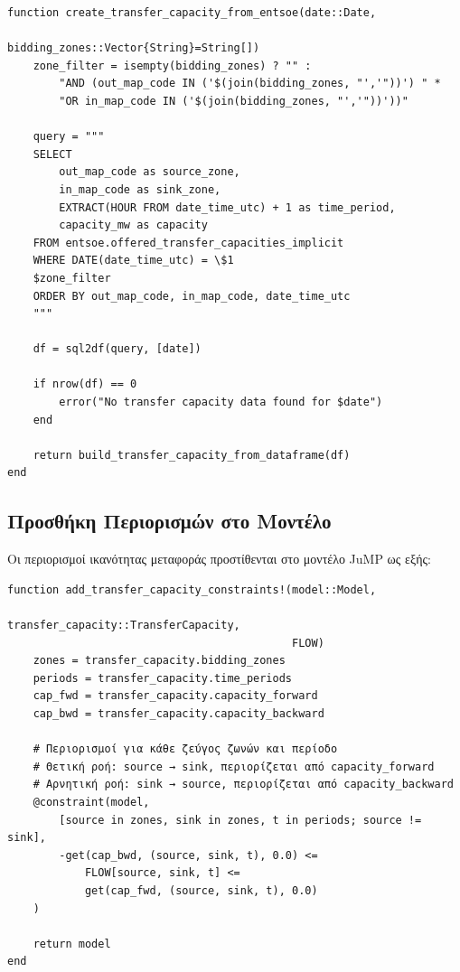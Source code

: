 \begin{samepage}
\begin{verbatim}
function create_transfer_capacity_from_entsoe(date::Date, 
                                              bidding_zones::Vector{String}=String[])
    zone_filter = isempty(bidding_zones) ? "" :
        "AND (out_map_code IN ('$(join(bidding_zones, "','"))') " *
        "OR in_map_code IN ('$(join(bidding_zones, "','"))'))"
    
    query = """
    SELECT
        out_map_code as source_zone,
        in_map_code as sink_zone,
        EXTRACT(HOUR FROM date_time_utc) + 1 as time_period,
        capacity_mw as capacity
    FROM entsoe.offered_transfer_capacities_implicit
    WHERE DATE(date_time_utc) = \$1
    $zone_filter
    ORDER BY out_map_code, in_map_code, date_time_utc
    """
    
    df = sql2df(query, [date])
    
    if nrow(df) == 0
        error("No transfer capacity data found for $date")
    end
    
    return build_transfer_capacity_from_dataframe(df)
end
\end{verbatim}
\end{samepage}

\subsection{Προσθήκη Περιορισμών στο Μοντέλο}
\label{subsec:adding-network-constraints}

Οι περιορισμοί ικανότητας μεταφοράς προστίθενται στο μοντέλο JuMP ως εξής:

\begin{samepage}
\begin{verbatim}
function add_transfer_capacity_constraints!(model::Model, 
                                            transfer_capacity::TransferCapacity, 
                                            FLOW)
    zones = transfer_capacity.bidding_zones
    periods = transfer_capacity.time_periods
    cap_fwd = transfer_capacity.capacity_forward
    cap_bwd = transfer_capacity.capacity_backward
    
    # Περιορισμοί για κάθε ζεύγος ζωνών και περίοδο
    # Θετική ροή: source → sink, περιορίζεται από capacity_forward
    # Αρνητική ροή: sink → source, περιορίζεται από capacity_backward
    @constraint(model, 
        [source in zones, sink in zones, t in periods; source != sink],
        -get(cap_bwd, (source, sink, t), 0.0) <= 
            FLOW[source, sink, t] <= 
            get(cap_fwd, (source, sink, t), 0.0)
    )
    
    return model
end
\end{verbatim}
\end{samepage}

